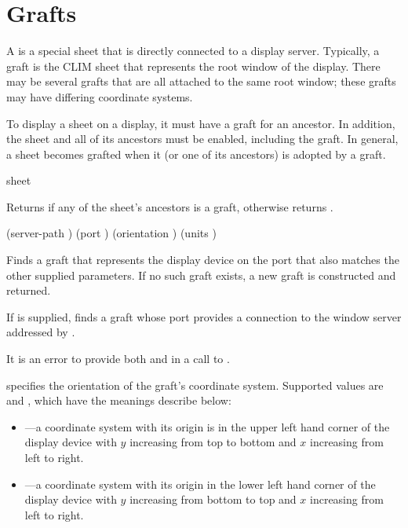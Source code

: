 \section {Grafts}

A  is a special sheet that is directly connected to a display
server.  Typically, a graft is the CLIM sheet that represents the root window of
the display.  There may be several grafts that are all attached to the same root
window; these grafts may have differing coordinate systems.

To display a sheet on a display, it must have a graft for an ancestor.  In
addition, the sheet and all of its ancestors must be enabled, including the
graft.  In general, a sheet becomes grafted when it (or one of its ancestors) is
adopted by a graft.

 {sheet}

Returns  if any of the sheet's ancestors is a graft, otherwise
returns .


 {\key (server-path )
                          (port )
                          (orientation ) (units )} 

Finds a graft that represents the display device on the port  that
also matches the other supplied parameters.  If no such graft exists, a new
graft is constructed and returned.

If  is supplied,  finds a graft whose port
provides a connection to the window server addressed by .

It is an error to provide both  and  in a call to
.

 specifies the orientation of the graft's coordinate
system.  Supported values are  and , which have the
meanings describe below:

\begin{itemize}
\item {}---a coordinate system with its origin is in the upper left
hand corner of the display device with $y$ increasing from top to bottom and $x$
increasing from left to right.

\item {}---a coordinate system with its origin in the lower left
hand corner of the display device with $y$ increasing from bottom to top and $x$
increasing from left to right.
\end{itemize}


